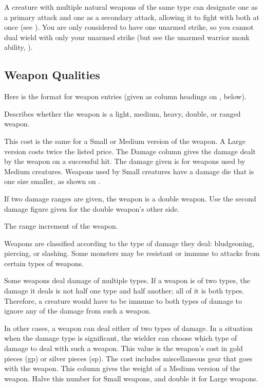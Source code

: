 A creature with multiple natural weapons of the same type can designate one as a primary attack and one as a secondary attack, allowing it to fight with both at once (see ). You are only considered to have one unarmed strike, so you cannot dual wield with only your unarmed strike (but see the unarmed warrior monk ability, ).

\subsection{Weapon Qualities}
Here is the format for weapon entries (given as column headings on , below).

 Describes whether the weapon is a light, medium, heavy, double, or ranged weapon.

\par This cost is the same for a Small or Medium version of the weapon. A Large version costs twice the listed price.
 The Damage column gives the damage dealt by the weapon on a successful hit. The damage given is for weapons used by Medium creatures. Weapons used by Small creatures have a damage die that is one size smaller, as shown on .

If two damage ranges are given, the weapon is a double weapon. Use the second damage figure given for the double weapon's other side.

 The range increment of the weapon.

 Weapons are classified according to the type of damage they deal: bludgeoning, piercing, or slashing. Some monsters may be resistant or immune to attacks from certain types of weapons.

Some weapons deal damage of multiple types. If a weapon is of two types, the damage it deals is not half one type and half another; all of it is both types. Therefore, a creature would have to be immune to both types of damage to ignore any of the damage from such a weapon.

In other cases, a weapon can deal either of two types of damage. In a situation when the damage type is significant, the wielder can choose which type of damage to deal with such a weapon.
 This value is the weapon's cost in gold pieces (gp) or silver pieces (sp). The cost includes miscellaneous gear that goes with the weapon.
 This column gives the weight of a Medium version of
the weapon. Halve this number for Small weapons, and double it for Large weapons.

